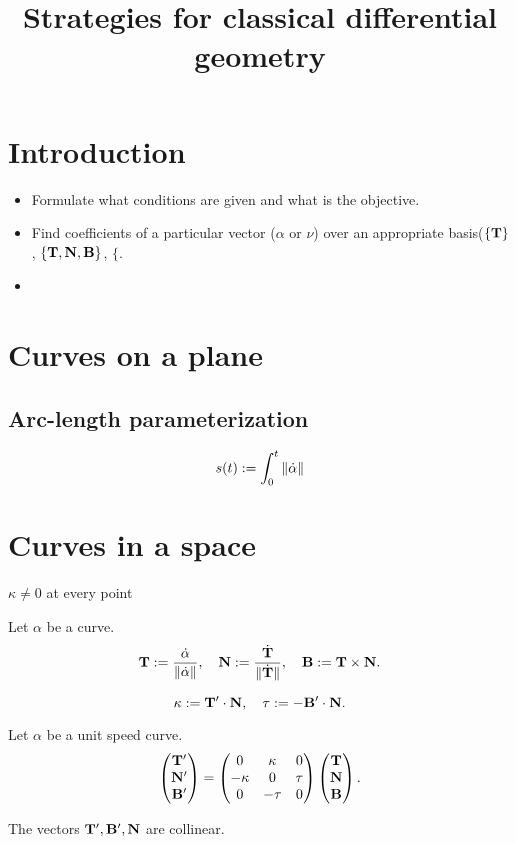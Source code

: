 \documentclass{../exp}
\title{Strategies for classical differential geometry}
\begin{document}
\maketitle

\section{Introduction}

\begin{itemize}
\item Formulate what conditions are given and what is the objective.
\item Find coefficients of a particular vector ($\alpha$ or $\nu$) over an appropriate basis($\{\mathbf{T}\}$, $\{\mathbf{T},\mathbf{N},\mathbf{B}\}$, $\{$.
\item 
\end{itemize}

\section{Curves on a plane}
\subsection{Arc-length parameterization}
\[s(t):=\int_0^t\left\lVert\dot\alpha\right\rVert\]



\section{Curves in a space}
$\kappa\ne0$ at every point


\begin{defn}
Let $\alpha$ be a curve.
\[\mathbf{T}:=\frac{\dot\alpha}{\left\lVert\dot\alpha\right\rVert},\quad\mathbf{N}:=\frac{\dot{\mathbf{T}}}{\|\dot{\mathbf{T}}\|},\quad\mathbf{B}:=\mathbf{T}\times\mathbf{N}.\]
\end{defn}
\begin{defn}
\[\kappa:=\mathbf{T}'\cdot\mathbf{N},\quad\tau:=-\mathbf{B}'\cdot\mathbf{N}.\]
\end{defn}

\begin{thm}
Let $\alpha$ be a unit speed curve.
\[\begin{pmatrix}\mathbf{T}'\\\mathbf{N}'\\\mathbf{B}'\end{pmatrix}=\begin{pmatrix}0&\kappa&0\\-\kappa&0&\tau\\0&-\tau&0\end{pmatrix}\begin{pmatrix}\mathbf{T}\\\mathbf{N}\\\mathbf{B}\end{pmatrix}.\]
\end{thm}
\begin{pf}
The vectors $\mathbf{T}',\mathbf{B}',\mathbf{N}$ are collinear.
\end{pf}
\end{document}
